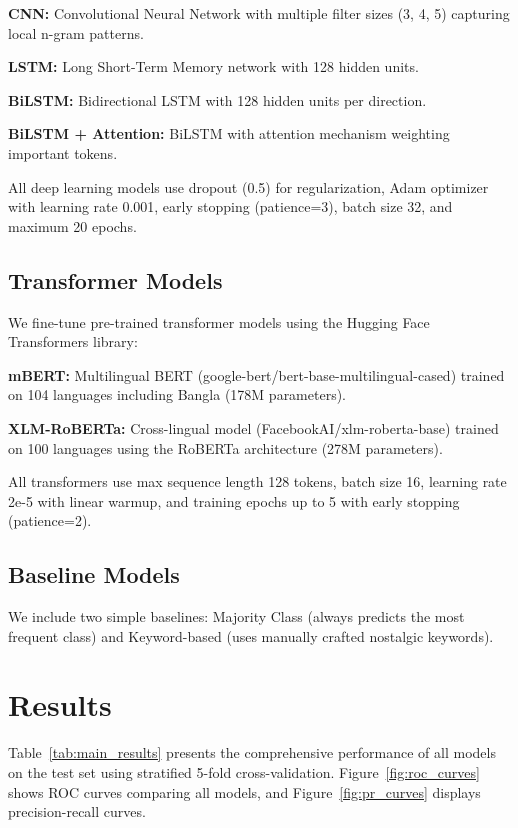 \documentclass[conference]{IEEEtran}
\begin{document}
\textbf{CNN:} Convolutional Neural Network with multiple filter sizes (3, 4, 5) capturing local n-gram patterns.

\textbf{LSTM:} Long Short-Term Memory network with 128 hidden units.

\textbf{BiLSTM:} Bidirectional LSTM with 128 hidden units per direction.

\textbf{BiLSTM + Attention:} BiLSTM with attention mechanism weighting important tokens.

All deep learning models use dropout (0.5) for regularization, Adam optimizer with learning rate 0.001, early stopping (patience=3), batch size 32, and maximum 20 epochs.

\subsection{Transformer Models}

We fine-tune pre-trained transformer models using the Hugging Face Transformers library:

\textbf{mBERT:} Multilingual BERT (google-bert/bert-base-multilingual-cased) trained on 104 languages including Bangla (178M parameters).

\textbf{XLM-RoBERTa:} Cross-lingual model (FacebookAI/xlm-roberta-base) trained on 100 languages using the RoBERTa architecture (278M parameters).

All transformers use max sequence length 128 tokens, batch size 16, learning rate 2e-5 with linear warmup, and training epochs up to 5 with early stopping (patience=2).

\subsection{Baseline Models}

We include two simple baselines: Majority Class (always predicts the most frequent class) and Keyword-based (uses manually crafted nostalgic keywords).

\section{Results}
\label{sec:results}

Table~\ref{tab:main_results} presents the comprehensive performance of all models on the test set using stratified 5-fold cross-validation. Figure~\ref{fig:roc_curves} shows ROC curves comparing all models, and Figure~\ref{fig:pr_curves} displays precision-recall curves.
\end{document}

